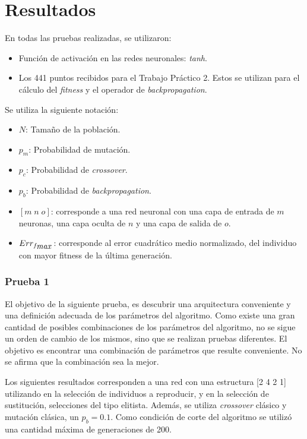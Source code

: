 \documentclass{article}
\begin{document}
\section{Resultados}

En todas las pruebas realizadas, se utilizaron:

\begin{itemize}
 \item Función de activación en las redes neuronales: \emph{tanh}.
 \item Los 441 puntos recibidos para el Trabajo Práctico 2. Estos se utilizan para el cálculo del \emph{fitness} y el operador 
 de \emph{backpropagation}.
\end{itemize}

Se utiliza la siguiente notación:

\begin{itemize}
 \item $N$: Tamaño de la población.
 \item $p_m$: Probabilidad de mutación.
 \item $p_c$: Probabilidad de \emph{crossover}.
 \item $p_b$: Probabilidad de \emph{backpropagation}.
 \item $[m \; n \; o]$: corresponde a una red neuronal con una capa de entrada de $m$ neuronas, una capa oculta de $n$ y una capa de salida de $o$.
 \item $Err_{f_{\mbox{\emph{max}}}}$: corresponde al error cuadrático medio normalizado, del individuo con mayor fitness de la última generación.
\end{itemize}


\subsubsection{Prueba 1}

El objetivo de la siguiente prueba, es descubrir una arquitectura conveniente y una definición adecuada de los parámetros del algoritmo.
Como existe una gran cantidad de posibles combinaciones de los parámetros del algoritmo, no se sigue un orden de cambio de los mismos, 
sino que se realizan pruebas diferentes. El objetivo es encontrar una combinación de parámetros que resulte conveniente. No se afirma que la combinación sea la mejor.

Los siguientes resultados corresponden a una red con una estructura [2 4 2 1] utilizando en la selección de individuos a reproducir, y en la
selección de sustitución, selecciones del tipo elitista. Además, se utiliza \emph{crossover} clásico y mutación clásica, un $p_b = 0.1$.
Como condición de corte del algoritmo se utilizó una cantidad máxima de generaciones de 200.\\
\end{document}
